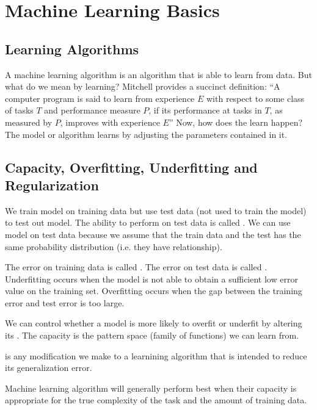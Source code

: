 
\chapter{Machine Learning Basics}


\section{Learning Algorithms}

A machine learning algorithm is an algorithm that is able to learn from data.
But what do we mean by learning?
Mitchell provides a succinct definition:
``A computer program is said to learn from experience $E$ with respect to some class of tasks $T$ and performance measure $P$, if its performance at tasks in $T$, as measured by $P$, improves with experience $E$''
Now, how does the learn happen?
The model or algorithm learns by adjusting the parameters contained in it.


\section{Capacity, Overfitting, Underfitting and Regularization}
We train model on training data but use test data (not used to train the model) to test out model.
The ability to perform on test data is called .
We can use model on test data because we assume that the train data and the test has the same probability distribution (i.e. they have relationship).

The error on training data is called .
The error on test data is called .
Underfitting occurs when the model is not able to obtain a sufficient low error value on the training set.
Overfitting occurs when the gap between the training error and test error is too large.


We can control whether a model is more likely to overfit or underfit by altering its .
The capacity is the pattern space (family of functions) we can learn from.

 is any modification we make to a learnining algorithm that is intended to reduce its generalization error.

\begin{tcolorbox}
  Machine learning algorithm will generally perform best when their capacity is appropriate for the true complexity of the task and the amount of training data.
\end{tcolorbox}



